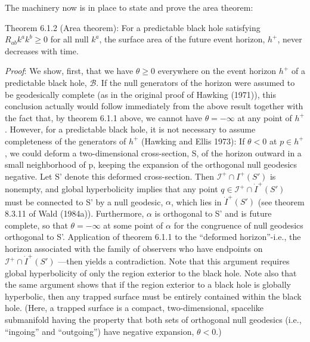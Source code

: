 \documentclass[11pt,a4paper]{article}
\begin{document}
The machinery now is in place to state and prove the area theorem:

Theorem 6.1.2 (Area theorem): For a predictable black hole satisfying \(R_{ab}k^ak^b \ge 0\) for all null \(k^a\), the surface area of the future event horizon, \(h^+\), never decreases with time.

\emph{Proof}: We show, first, that we have \(\theta \ge 0\) everywhere on the event horizon \(h^+\) of a predictable black hole, \(\mathcal{B}\). If the null generators of the horizon were assumed to be geodesically complete (as in the original proof of Hawking (1971)), this conclusion actually would follow immediately from the above result together with the fact that, by theorem 6.1.1 above, we cannot have \(\theta = -\infty\) at any point of \(h^+\). However, for a predictable black hole, it is not necessary to assume completeness of the generators of \(h^+\) (Hawking and Ellis 1973): If \(\theta < 0\) at \(p \in h^+\), we could deform a two-dimensional cross-section, S, of the horizon outward in a small neighborhood of p, keeping the expansion of the orthogonal null geodesics negative. Let S' denote \hypertarget{source-152}{} this deformed cross-section. Then \(\mathscr I^+\cap I^+(S')\) is nonempty, and global hyperbolicity implies that any point \(q \in \mathscr{I}^+ \cap \dot{I}^+(S')\) must be connected to S' by a null geodesic, \(\alpha\), which lies in \(\dot I^+(S')\) (see theorem 8.3.11 of Wald (1984a)). Furthermore, \(\alpha\) is orthogonal to S' and is future complete, so that \(\theta = -\infty\) at some point of \(\alpha\) for the congruence of null geodesics orthogonal to S'. Application of theorem 6.1.1 to the ``deformed horizon''-i.e., the horizon associated with the family of observers who have endpoints on \(\mathscr I^+\cap\dot{I}^+(S')\) ---then yields a contradiction. Note that this argument requires global hyperbolicity of only the region exterior to the black hole. Note also that the same argument shows that if the region exterior to a black hole is globally hyperbolic, then any trapped surface must be entirely contained within the black hole. (Here, a trapped surface is a compact, two-dimensional, spacelike submanifold having the property that both sets of orthogonal null geodesics (i.e., ``ingoing'' and ``outgoing'') have negative expansion, \(\theta < 0\).)
\end{document}
